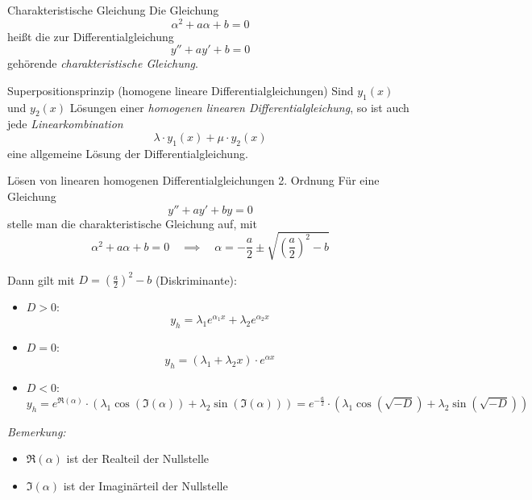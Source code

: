 \documentclass[german]{../spicker}
\begin{document}
\begin{defi}{Charakteristische Gleichung}
    Die Gleichung
    $$
        \alpha^2 + a\alpha + b = 0
    $$
    heißt die zur Differentialgleichung
    $$
        y'' + ay' + b = 0
    $$
    gehörende \emph{charakteristische Gleichung}.
\end{defi}

\begin{bonus}{Superpositionsprinzip (homogene lineare Differentialgleichungen)}
    Sind $y_1(x)$ und $y_2(x)$ Lösungen einer \emph{homogenen linearen Differentialgleichung}, so ist auch jede \emph{Linearkombination}
    $$
        \lambda\cdot  y_1(x) + \mu\cdot  y_2(x)
    $$
    eine allgemeine Lösung der Differentialgleichung.
\end{bonus}

\begin{algo}{Lösen von linearen homogenen Differentialgleichungen 2. Ordnung}
    Für eine Gleichung
    $$
        \boxed{y'' + ay' + by = 0}
    $$
    stelle man die charakteristische Gleichung auf, mit
    $$
        \alpha^2 + a\alpha + b = 0 \quad \implies \quad \alpha = -\frac{a}{2} \pm \sqrt{\left(\frac{a}{2}\right)^2 - b}
    $$

    Dann gilt mit $D = \left(\frac{a}{2}\right)^2 - b$ (Diskriminante):
    \begin{itemize}
        \item $D > 0$:
              $$
                  y_h = \lambda_1 e^{\alpha_1 x} + \lambda_2 e^{\alpha_2 x}
              $$
        \item $D = 0$:
              $$
                  y_h = (\lambda_1 + \lambda_2x)\cdot  e^{\alpha x}
              $$
        \item $D < 0$:
              $$
                  y_h = e^{\Re(\alpha)} \cdot \left( \lambda_1 \cos(\Im(\alpha)) + \lambda_2 \sin(\Im(\alpha)) \right) = e^{-\frac{a}{2}} \cdot \left( \lambda_1 \cos(\sqrt{-D}) + \lambda_2 \sin(\sqrt{-D}) \right)
              $$
    \end{itemize}

    \emph{Bemerkung:}
    \begin{itemize}
        \item $\Re(\alpha)$ ist der Realteil der Nullstelle
        \item $\Im(\alpha)$ ist der Imaginärteil der Nullstelle
    \end{itemize}
\end{algo}
\end{document}

